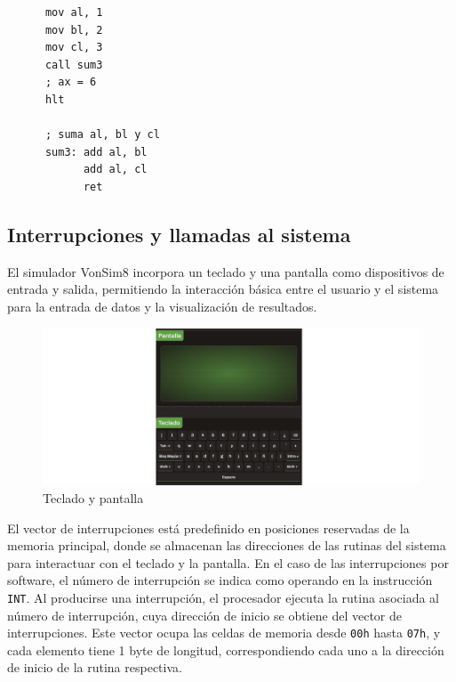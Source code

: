 \documentclass[12pt,oneside]{templates/unerthesis}
\begin{document}
\begin{lstlisting}
      mov al, 1
      mov bl, 2
      mov cl, 3
      call sum3
      ; ax = 6
      hlt

      ; suma al, bl y cl
      sum3: add al, bl
            add al, cl
            ret\end{lstlisting}

\hypertarget{interrupciones-y-llamadas-al-sistema}{%
\subsection{Interrupciones y llamadas al sistema}\label{interrupciones-y-llamadas-al-sistema}}

El simulador VonSim8 incorpora un teclado y una pantalla como dispositivos de entrada y salida, permitiendo la interacción básica entre el usuario y el sistema para la entrada de datos y la visualización de resultados.

\begin{figure}

{\centering \includegraphics[width=0.85\linewidth]{images/tecladopantalla} 

}

\caption{Teclado y pantalla}\label{fig:tecladopantalla}
\end{figure}

El vector de interrupciones está predefinido en posiciones reservadas de la memoria principal, donde se almacenan las direcciones de las rutinas del sistema para interactuar con el teclado y la pantalla. En el caso de las interrupciones por software, el número de interrupción se indica como operando en la instrucción \texttt{INT}. Al producirse una interrupción, el procesador ejecuta la rutina asociada al número de interrupción, cuya dirección de inicio se obtiene del vector de interrupciones. Este vector ocupa las celdas de memoria desde \texttt{00h} hasta \texttt{07h}, y cada elemento tiene 1 byte de longitud, correspondiendo cada uno a la dirección de inicio de la rutina respectiva.
\end{document}
